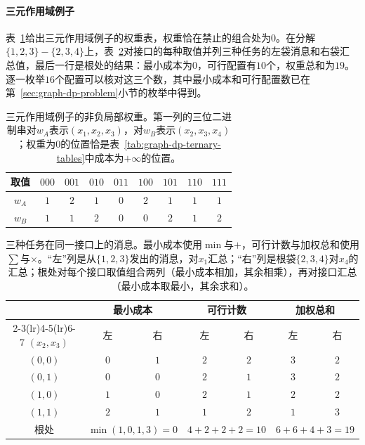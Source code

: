 \paragraph{三元作用域例子}
表~\ref{tab:graph-dp-weights}给出三元作用域例子的权重表，权重恰在禁止的组合处为$0$。在分解$\{1,2,3\}-\{2,3,4\}$上，表~\ref{tab:graph-dp-three-aggregations}对接口的每种取值并列三种任务的左袋消息和右袋汇总值，最后一行是根处的结果：最小成本为$0$，可行配置有$10$个，权重总和为$19$。逐一枚举$16$个配置可以核对这三个数，其中最小成本和可行配置数已在第~\ref{sec:graph-dp-problem}小节的枚举中得到。

\begin{table}[!htb]
  \centering
  \begin{tabular}{ccccccccc}
    \toprule
    取值 & $000$ & $001$ & $010$ & $011$ & $100$ & $101$ & $110$ & $111$\\
    \midrule
    $w_A$ & $1$ & $2$ & $1$ & $0$ & $2$ & $1$ & $1$ & $1$\\
    $w_B$ & $1$ & $1$ & $2$ & $0$ & $0$ & $2$ & $1$ & $2$\\
    \bottomrule
  \end{tabular}
  \caption{三元作用域例子的非负局部权重。第一列的三位二进制串对$w_A$表示$(x_1,x_2,x_3)$，对$w_B$表示$(x_2,x_3,x_4)$；权重为$0$的位置恰是表~\ref{tab:graph-dp-ternary-tables}中成本为$+\infty$的位置。}
  \label{tab:graph-dp-weights}
\end{table}

\begin{table}[!htb]
  \centering
  \begin{tabular}{ccccccc}
    \toprule
    & \multicolumn{2}{c}{最小成本} & \multicolumn{2}{c}{可行计数} & \multicolumn{2}{c}{加权总和}\\
    \cmidrule(lr){2-3}\cmidrule(lr){4-5}\cmidrule(lr){6-7}
    $(x_2,x_3)$ & 左 & 右 & 左 & 右 & 左 & 右\\
    \midrule
    $(0,0)$ & $0$ & $1$ & $2$ & $2$ & $3$ & $2$\\
    $(0,1)$ & $0$ & $0$ & $2$ & $1$ & $3$ & $2$\\
    $(1,0)$ & $1$ & $0$ & $2$ & $1$ & $2$ & $2$\\
    $(1,1)$ & $2$ & $1$ & $1$ & $2$ & $1$ & $3$\\
    \midrule
    根处 & \multicolumn{2}{c}{$\min(1,0,1,3)=0$} & \multicolumn{2}{c}{$4+2+2+2=10$} & \multicolumn{2}{c}{$6+6+4+3=19$}\\
    \bottomrule
  \end{tabular}
  \caption{三种任务在同一接口上的消息。最小成本使用$\min$与$+$，可行计数与加权总和使用$\sum$与$\times$。“左”列是从$\{1,2,3\}$发出的消息，对$x_1$汇总；“右”列是根袋$\{2,3,4\}$对$x_4$的汇总；根处对每个接口取值组合两列（最小成本相加，其余相乘），再对接口汇总（最小成本取最小，其余求和）。}
  \label{tab:graph-dp-three-aggregations}
\end{table}

